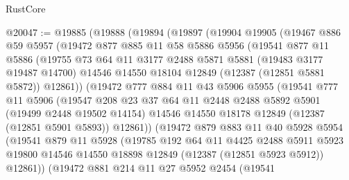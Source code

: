 \begin{lexlean}{RustCore}
\begin{coremodule}
@20047 := @19885
    (@19888
      (@19894
        (@19897
          (@19904
            @19905
            (@19467
              @886
              @59
              @5957
              (@19472
                @877
                @885
                @11
                @58
                @5886
                @5956
                (@19541
                  @877
                  @11
                  @5886
                  (@19755
                    @73
                    @64
                    @11
                    @3177
                    @2488
                    @5871
                    @5881
                    (@19483 @3177 @19487 @14700)
                    @14546
                    @14550
                    @18104
                    @12849
                    (@12387 (@12851 @5881 @5872))
                    @12861))
                (@19472
                  @777
                  @884
                  @11
                  @43
                  @5906
                  @5955
                  (@19541
                    @777
                    @11
                    @5906
                    (@19547
                      @208
                      @23
                      @37
                      @64
                      @11
                      @2448
                      @2488
                      @5892
                      @5901
                      (@19499 @2448 @19502 @14154)
                      @14546
                      @14550
                      @18178
                      @12849
                      (@12387 (@12851 @5901 @5893))
                      @12861))
                  (@19472
                    @879
                    @883
                    @11
                    @40
                    @5928
                    @5954
                    (@19541
                      @879
                      @11
                      @5928
                      (@19785
                        @192
                        @64
                        @11
                        @4425
                        @2488
                        @5911
                        @5923
                        @19800
                        @14546
                        @14550
                        @18898
                        @12849
                        (@12387 (@12851 @5923 @5912))
                        @12861))
                    (@19472
                      @881
                      @214
                      @11
                      @27
                      @5952
                      @2454
                      (@19541

\end{coremodule}
\end{lexlean}
